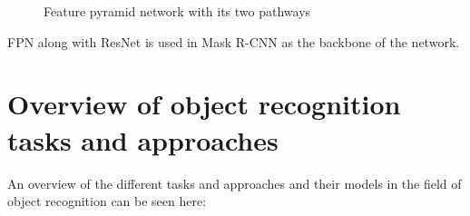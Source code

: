 \begin{figure}[H]
	\caption{\label{fig:fpn} Feature pyramid network with its two pathways}
\end{figure}

FPN along with ResNet is used in Mask R-CNN as the backbone of the network.

\section{Overview of object recognition tasks and approaches}

An overview of the different tasks and approaches and their models  in the field of object recognition can be seen here:

